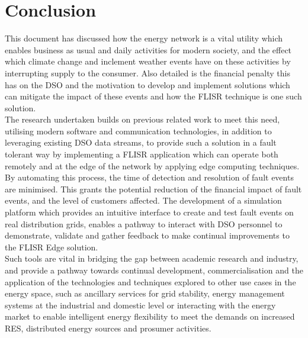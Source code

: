 \section{Conclusion}
\label{sec:conclusion}

\noindent This document has discussed how the energy network is a vital utility which enables business as usual and daily activities for modern society, and the effect which climate change
and inclement weather events have on these activities by interrupting supply to the consumer. Also detailed is the financial penalty this has on the DSO and the motivation to
develop and implement solutions which can mitigate the impact of these events and how the FLISR technique is one such solution.
\\
The research undertaken builds on previous related work to meet this need, utilising modern software and communication technologies, in addition to leveraging existing DSO data streams,
to provide such a solution in a fault tolerant way by implementing a FLISR application which can operate both remotely and at the edge of the network by applying edge computing techniques.
By automating this process, the time of detection and resolution of fault events are minimised. This grants the potential reduction of the financial
impact of fault events, and the level of customers affected. The development of a simulation platform which provides an intuitive interface to create and test fault events on real distribution grids, enables a pathway
to interact with DSO personnel to demonstrate, validate and gather feedback to make continual improvements to the FLISR Edge solution.
\\
Such tools are vital in bridging the gap between academic research and industry, and provide a pathway towards continual development, commercialisation and the application of
the technologies and techniques explored to other use cases in the energy space, such as ancillary services for grid stability, energy management systems at the industrial and domestic level or interacting with
the energy market to enable intelligent energy flexibility to meet the demands on increased RES, distributed energy sources and prosumer activities.

